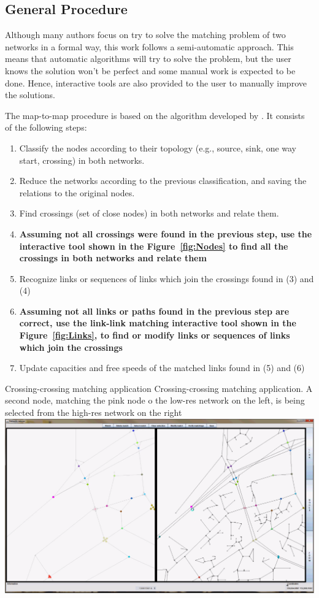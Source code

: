 \subsection{General Procedure}
Although many authors focus on try to solve the matching problem of two networks in a formal way, this work follows a semi-automatic approach. This means that automatic algorithms will try to solve the problem, but the user knows the solution won't be perfect and some manual work is expected to be done. Hence, interactive tools are also provided to the user to manually improve the solutions.

The map-to-map procedure is based on the algorithm developed by \citet{BalmerEtAl_STRC_2005}. It consists of the following steps:
%
\begin{enumerate}
\item Classify the nodes according to their topology (e.g., source, sink, one way start, crossing) in both networks.
\item Reduce the networks according to the previous classification, and saving the relations to the original nodes.
\item Find crossings (set of close nodes) in both networks and relate them.
\item \textbf{Assuming not all crossings were found in the previous step, use the interactive tool shown in the Figure~\ref{fig:Nodes} to find all the crossings in both networks and relate them}
\item Recognize links or sequences of links which join the crossings found in (3) and (4)
\item \textbf{Assuming not all links or paths found in the previous step are correct, use the link-link matching interactive tool shown in the Figure~\ref{fig:Links}, to find or modify links or sequences of links which join the crossings}
\item Update capacities and free speeds of the matched links found in (5) and (6)
\end{enumerate}
%
\createfigure
{Crossing-crossing matching application}
{Crossing-crossing matching application. A second node, matching the pink node o the low-res network on the left, is being selected from the high-res network on the right}
{\label{fig:Nodes}}
{\includegraphics[width=1.0\textwidth]{extending/figures/netEdSing/Nodes.png}}
{}

